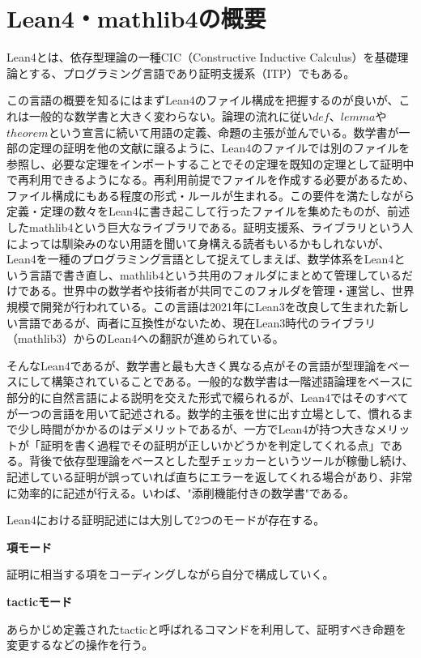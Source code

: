 \documentclass[a4paper,12pt]{bxjsbook}
\newlength{\customindent}
\newenvironment{body}{
  \par
  \begingroup
  \setlength{\leftskip}{\customindent}
  \setlength{\rightskip}{0pt}
  \setlength{\parindent}{1em}
  \setlength{\displayindent}{\customindent}
  \setlength{\displaywidth}{\dimexpr\linewidth-\customindent\relax}
}{
  \par
  \endgroup
}
\theoremstyle{theorem}
\begin{document}
    \section{Lean4・mathlib4の概要}
    \begin{body}
        \indent Lean4とは、依存型理論の一種CIC（Constructive Inductive Calculus）を基礎理論とする、プログラミング言語であり証明支援系（ITP）でもある。

        \indent この言語の概要を知るにはまずLean4のファイル構成を把握するのが良いが、これは一般的な数学書と大きく変わらない。論理の流れに従い$def$、$lemma$や$theorem$という宣言に続いて用語の定義、命題の主張が並んでいる。数学書が一部の定理の証明を他の文献に譲るように、Lean4のファイルでは別のファイルを参照し、必要な定理をインポートすることでその定理を既知の定理として証明中で再利用できるようになる。再利用前提でファイルを作成する必要があるため、ファイル構成にもある程度の形式・ルールが生まれる。この要件を満たしながら定義・定理の数々をLean4に書き起こして行ったファイルを集めたものが、前述したmathlib4という巨大なライブラリである。証明支援系、ライブラリという人によっては馴染みのない用語を聞いて身構える読者もいるかもしれないが、Lean4を一種のプログラミング言語として捉えてしまえば、数学体系をLean4という言語で書き直し、mathlib4という共用のフォルダにまとめて管理しているだけである。世界中の数学者や技術者が共同でこのフォルダを管理・運営し、世界規模で開発が行われている。この言語は2021年にLean3を改良して生まれた新しい言語であるが、両者に互換性がないため、現在Lean3時代のライブラリ（mathlib3）からのLean4への翻訳が進められている。

        \indent そんなLean4であるが、数学書と最も大きく異なる点がその言語が型理論をベースにして構築されていることである。一般的な数学書は一階述語論理をベースに部分的に自然言語による説明を交えた形式で綴られるが、Lean4ではそのすべてが一つの言語を用いて記述される。数学的主張を世に出す立場として、慣れるまで少し時間がかかるのはデメリットであるが、一方でLean4が持つ大きなメリットが「証明を書く過程でその証明が正しいかどうかを判定してくれる点」である。背後で依存型理論をベースとした型チェッカーというツールが稼働し続け、記述している証明が誤っていれば直ちにエラーを返してくれる場合があり、非常に効率的に記述が行える。いわば、"添削機能付きの数学書"である。

        \indent Lean4における証明記述には大別して2つのモードが存在する。
        
        \begin{bodyitemize} [leftmargin=1.8em]
            \item[]
                \textbf{項モード}\par\noindent
                証明に相当する項をコーディングしながら自分で構成していく。
            \item[]
                \textbf{tacticモード}\par\noindent
                あらかじめ定義されたtacticと呼ばれるコマンドを利用して、証明すべき命題を変更するなどの操作を行う。
        \end{bodyitemize}


\end{body}
\end{document}
